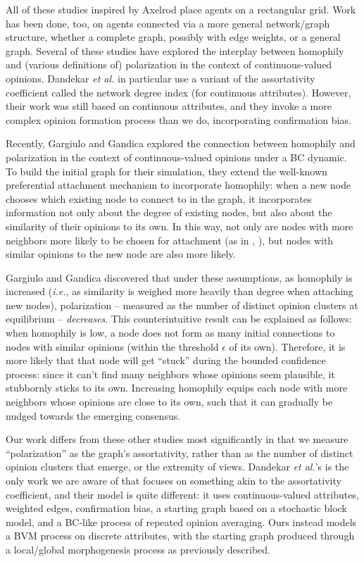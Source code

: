 All of these studies inspired by Axelrod place agents on a rectangular grid.
Work has been done, too, on agents connected via a more general network/graph
structure, whether a complete graph, possibly with edge
weights\cite{deffuant_how_2002,degroot_reaching_1974}, or a general
graph\cite{dandekar_biased_2013}. Several of these studies have explored the
interplay between homophily and (various definitions of) polarization in the
context of continuous-valued opinions. Dandekar \textit{et
al.}\cite{dandekar_biased_2013} in particular use a variant of the
assortativity coefficient called the network degree index (for continuous
attributes). However, their work was still based on continuous attributes, and
they invoke a more complex opinion formation process than we do, incorporating
confirmation bias.

Recently, Gargiulo and Gandica\cite{gargiulo_role_2017} explored the
connection between homophily and polarization in the context of
continuous-valued opinions under a BC dynamic. To build the initial graph for
their simulation, they extend the well-known preferential attachment mechanism
\cite{barabasi_emergence_1999} to incorporate homophily: when a new node
chooses which existing node to connect to in the graph, it incorporates
information not only about the degree of existing nodes, but also about
the similarity of their opinions to its own. In this way, not only are
nodes with more neighbors more likely to be chosen for attachment (as in
\cite{barabasi_emergence_1999}, \cite{deffuant_mixing_2000}), but nodes with
similar opinions to the new node are also more likely. 

Gargiulo and Gandica discovered that under these assumptions, as homophily is
increased (\textit{i.e.}, as similarity is weighed more heavily than degree
when attaching new nodes), polarization -- measured as the number of distinct
opinion clusters at equilibrium -- \textit{decreases}. This counterintuitive
result can be explained as follows: when homophily is low, a node does not
form as many initial connections to nodes with similar opinions (within the
threshold $\epsilon$ of its own). Therefore, it is more likely that that node
will get ``stuck'' during the bounded confidence process: since it can't find
many neighbors whose opinions seem plausible, it stubbornly sticks to its own.
Increasing homophily equips each node with more neighbors whose opinions are
close to its own, such that it can gradually be nudged towards the emerging
consensus.

Our work differs from these other studies most significantly in that we
measure ``polarization'' as the graph's assortativity, rather than as the
number of distinct opinion clusters that emerge, or the extremity of views.
Dandekar \textit{et al.}'s is the only work we are aware of that focuses on
something akin to the assortativity coefficient, and their model is quite
different: it uses continuous-valued attributes, weighted edges, confirmation
bias, a starting graph based on a stochastic block model, and a BC-like
process of repeated opinion averaging. Ours instead models a BVM process on
discrete attributes, with the starting graph produced through a local/global
morphogenesis process as previously described.

